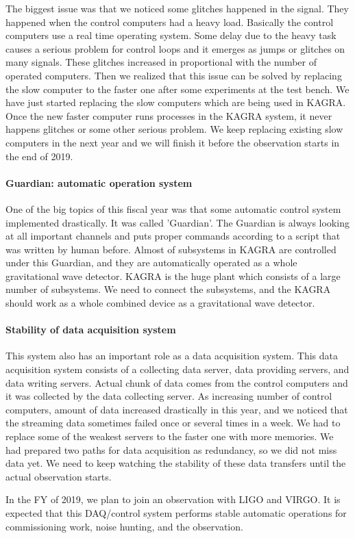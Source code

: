 The biggest issue was that we noticed some glitches happened in the signal. They happened when the control computers had a heavy load. Basically the control computers use a real time operating system. Some delay due to the heavy task causes a serious problem for control loops and it emerges as jumps or glitches on many signals. These glitches increased in proportional with the number of operated computers. Then we realized that this issue can be solved by replacing the slow computer to the faster one after some experiments at the test bench. We have just started replacing the slow computers which are being used in KAGRA. Once the new faster computer runs processes in the KAGRA system, it never happens glitches or some other serious problem. We keep replacing existing slow computers in the next year and we will finish it before the observation starts in the end of 2019.

\paragraph*{\bi Guardian: automatic operation system}

One of the big topics of this fiscal year was that some automatic control system implemented drastically. It was called 'Guardian'. The Guardian is always looking at all important channels and puts proper commands according to a script that was written by human before. Almost of subsystems in KAGRA are controlled under this Guardian, and they are automatically operated as a whole gravitational wave detector. KAGRA is the huge plant which consists of a large number of subsystems. We need to connect the subsystems, and the KAGRA should work as a whole combined device as a gravitational wave detector.


\paragraph*{\bi Stability of data acquisition system}

This system also has an important role as a data acquisition system. This data acquisition system consists of a collecting data server, data providing servers, and data writing servers. Actual chunk of data comes from the control computers and it was collected by the data collecting server. As increasing number of control computers, amount of data increased drastically in this year, and we noticed that the streaming data sometimes failed once or several times in a week. We had to replace some of the weakest servers to the faster one with more memories. We had prepared two paths for data acquisition as redundancy, so we did not miss data yet. We need to keep watching the stability of these data transfers until the actual observation starts.

In the FY of 2019, we plan to join an observation with LIGO and VIRGO. It is expected that this DAQ/control system performs stable automatic operations for commissioning work, noise hunting, and the observation.


%




